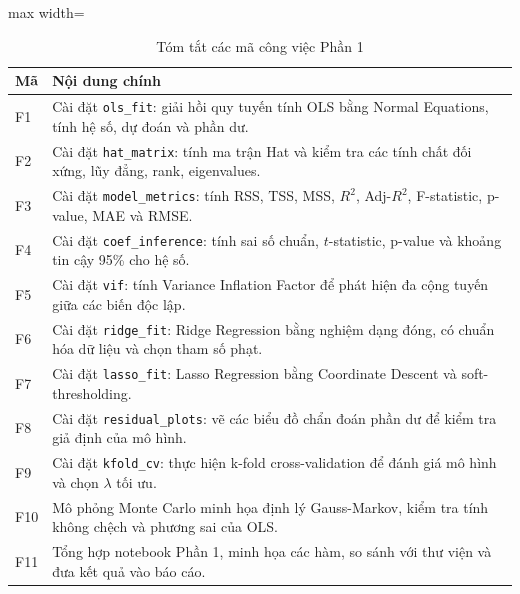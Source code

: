 \begingroup
\small
\renewcommand{\arraystretch}{1.15}
\begin{table}[H]
\centering
\caption{Tóm tắt các mã công việc Phần 1}
\label{tab:assignment_f_summary}
\begin{adjustbox}{max width=\textwidth}
\begin{tabular}{|p{}|p{}|}
\hline
\textbf{Mã} & \textbf{Nội dung chính} \\ \hline
F1 & Cài đặt \texttt{ols\_fit}: giải hồi quy tuyến tính OLS bằng Normal Equations, tính hệ số, dự đoán và phần dư. \\ \hline
F2 & Cài đặt \texttt{hat\_matrix}: tính ma trận Hat và kiểm tra các tính chất đối xứng, lũy đẳng, rank, eigenvalues. \\ \hline
F3 & Cài đặt \texttt{model\_metrics}: tính RSS, TSS, MSS, $R^2$, Adj-$R^2$, F-statistic, p-value, MAE và RMSE. \\ \hline
F4 & Cài đặt \texttt{coef\_inference}: tính sai số chuẩn, $t$-statistic, p-value và khoảng tin cậy 95\% cho hệ số. \\ \hline
F5 & Cài đặt \texttt{vif}: tính Variance Inflation Factor để phát hiện đa cộng tuyến giữa các biến độc lập. \\ \hline
F6 & Cài đặt \texttt{ridge\_fit}: Ridge Regression bằng nghiệm dạng đóng, có chuẩn hóa dữ liệu và chọn tham số phạt. \\ \hline
F7 & Cài đặt \texttt{lasso\_fit}: Lasso Regression bằng Coordinate Descent và soft-thresholding. \\ \hline
F8 & Cài đặt \texttt{residual\_plots}: vẽ các biểu đồ chẩn đoán phần dư để kiểm tra giả định của mô hình. \\ \hline
F9 & Cài đặt \texttt{kfold\_cv}: thực hiện k-fold cross-validation để đánh giá mô hình và chọn $\lambda$ tối ưu. \\ \hline
F10 & Mô phỏng Monte Carlo minh họa định lý Gauss-Markov, kiểm tra tính không chệch và phương sai của OLS. \\ \hline
F11 & Tổng hợp notebook Phần 1, minh họa các hàm, so sánh với thư viện và đưa kết quả vào báo cáo. \\ \hline
\end{tabular}
\end{adjustbox}
\end{table}

